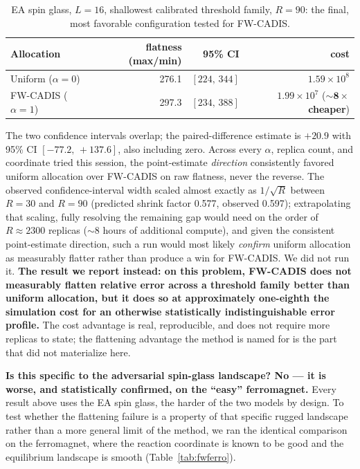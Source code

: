 \documentclass[a4paper,fleqn]{cas-sc}
\begin{document}
\begin{table}[H]
\centering\small
\caption{EA spin glass, $L=16$, shallowest calibrated threshold family, $R=90$: the final,
	most favorable configuration tested for FW-CADIS.}
\label{tab:fwcadis}
\begin{tabular}{lrrr}
	\toprule
	Allocation & flatness (max/min) & 95\% CI & cost \\
	\midrule
	Uniform ($\alpha=0$) & 276.1 & $[224,\,344]$ & $1.59\times10^{8}$ \\
	FW-CADIS ($\alpha=1$) & 297.3 & $[234,\,388]$ & $1.99\times10^{7}$ ($\mathbf{\sim\!8\times}$ \textbf{cheaper}) \\
	\bottomrule
\end{tabular}
\end{table}

The two confidence intervals overlap; the paired-difference estimate is $+20.9$ with 95\%
CI $[-77.2,\,+137.6]$, also including zero. Across every $\alpha$, replica count, and
coordinate tried this session, the point-estimate \emph{direction} consistently favored
uniform allocation over FW-CADIS on raw flatness, never the reverse. The observed
confidence-interval width scaled almost exactly as $1/\sqrt{R}$ between $R=30$ and $R=90$
(predicted shrink factor 0.577, observed 0.597); extrapolating that scaling, fully resolving
the remaining gap would need on the order of $R\approx2300$ replicas ($\sim$8 hours of
additional compute), and given the consistent point-estimate direction, such a run would
most likely \emph{confirm} uniform allocation as measurably flatter rather than produce a
win for FW-CADIS. We did not run it. \textbf{The result we report instead: on this problem,
	FW-CADIS does not measurably flatten relative error across a threshold family better than
	uniform allocation, but it does so at approximately one-eighth the simulation cost for an
	otherwise statistically indistinguishable error profile.} The cost advantage is real,
reproducible, and does not require more replicas to state; the flattening advantage the
method is named for is the part that did not materialize here.

\textbf{Is this specific to the adversarial spin-glass landscape? No --- it is worse, and
	statistically confirmed, on the ``easy'' ferromagnet.} Every result above uses the EA spin
glass, the harder of the two models by design. To test whether the flattening failure is a
property of that specific rugged landscape rather than a more general limit of the method,
we ran the identical comparison on the ferromagnet, where the reaction coordinate is known
to be good and the equilibrium landscape is smooth (Table~\ref{tab:fwferro}).
\end{document}
